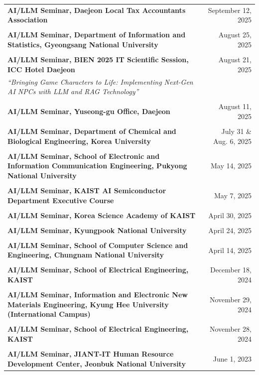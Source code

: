 \documentclass[11pt,a4paper]{article}
\begin{document}
\begin{tabular}{p{13cm}r}
\textbf{AI/LLM Seminar, Daejeon Local Tax Accountants Association} & September 12, 2025 \\
\\
\textbf{AI/LLM Seminar, Department of Information and Statistics, Gyeongsang National University} & August 25, 2025 \\
\\
\textbf{AI/LLM Seminar, BIEN 2025 IT Scientific Session, ICC Hotel Daejeon} & August 21, 2025 \\
\textit{``Bringing Game Characters to Life: Implementing Next-Gen AI NPCs with LLM and RAG Technology''} & \\
\\
\textbf{AI/LLM Seminar, Yuseong-gu Office, Daejeon} & August 11, 2025 \\
\\
\textbf{AI/LLM Seminar, Department of Chemical and Biological Engineering, Korea University} & July 31 \& Aug. 6, 2025 \\
\\
\textbf{AI/LLM Seminar, School of Electronic and Information Communication Engineering, Pukyong National University} & May 14, 2025 \\
\\
\textbf{AI/LLM Seminar, KAIST AI Semiconductor Department Executive Course} & May 7, 2025 \\
\\
\textbf{AI/LLM Seminar, Korea Science Academy of KAIST} & April 30, 2025 \\
\\
\textbf{AI/LLM Seminar, Kyungpook National University} & April 24, 2025 \\
\\
\textbf{AI/LLM Seminar, School of Computer Science and Engineering, Chungnam National University} & April 14, 2025 \\
\\
\textbf{AI/LLM Seminar, School of Electrical Engineering, KAIST} & December 18, 2024 \\
\\
\textbf{AI/LLM Seminar, Information and Electronic New Materials Engineering, Kyung Hee University (International Campus)} & November 29, 2024 \\
\\
\textbf{AI/LLM Seminar, School of Electrical Engineering, KAIST} & November 28, 2024 \\
\\
\textbf{AI/LLM Seminar, JIANT-IT Human Resource Development Center, Jeonbuk National University} & June 1, 2023 \\
\end{tabular}
\end{document}
